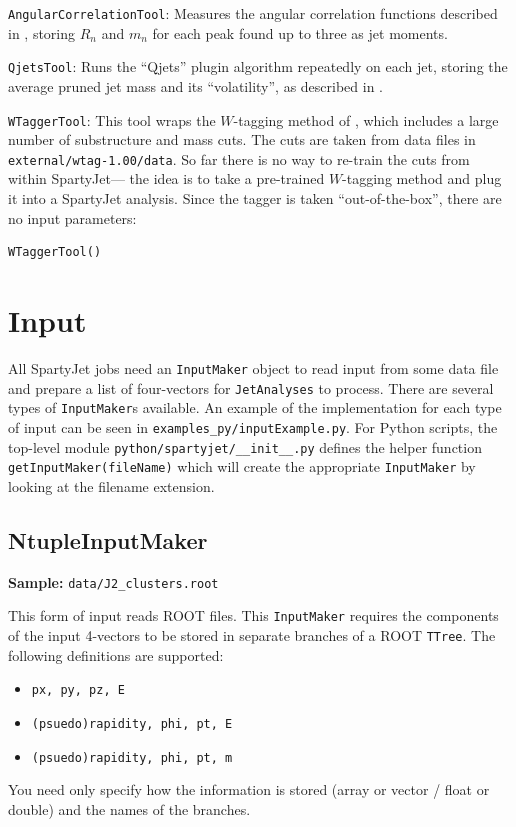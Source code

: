 \documentclass{article}
\newcommand{\prog}[1]{{\sc #1}\xspace}
\newcommand{\code}[1]{{\tt #1}\xspace}
\newcommand{\codes}[1]{{\tt #1}s\xspace}
\newcommand{\SJ}[0]{\prog{SpartyJet}}
\begin{document}
\begin{description}
\item \code{AngularCorrelationTool}:
Measures the angular correlation functions described in \cite{ACF}, storing $R_n$ and $m_n$ for each peak found up to three as jet moments.

\item \code{QjetsTool}:
Runs the ``Qjets'' plugin algorithm repeatedly on each jet, storing the average pruned jet mass and its ``volatility'', as described in \cite{Qjets}.

\item{\code{WTaggerTool}}:
This tool wraps the $W$-tagging method of \cite{Wtag}, which includes a large number of substructure and mass cuts.  The cuts are taken from data files in \verb+external/wtag-1.00/data+.  So far there is no way to re-train the cuts from within \SJ --- the idea is to take a pre-trained $W$-tagging method and plug it into a \SJ analysis.  Since the tagger is taken ``out-of-the-box'', there are no input parameters:

\begin{lstlisting}
WTaggerTool()
\end{lstlisting}

\end{description}



\section{Input}
\label{f0:Input}

All \SJ jobs need an \code{InputMaker} object to read input from some data file and prepare a list of four-vectors for \code{JetAnalyses} to process.  There are several types of \codes{InputMaker} available.  An example of the implementation for each type of input can be seen in \verb+examples_py/inputExample.py+.  For Python scripts, the top-level module \verb+python/spartyjet/__init__.py+ defines the helper function \code{getInputMaker(fileName)} which will create the appropriate \code{InputMaker} by looking at the filename extension.

\subsection{NtupleInputMaker}
{\bf Sample:} \verb+data/J2_clusters.root+

This form of input reads \prog{ROOT} files.  This \code{InputMaker} requires the components of the input 4-vectors to be stored in separate branches of a \prog{ROOT} \code{TTree}.  The following definitions are supported:
\begin{itemize}
\item \code{px, py, pz, E}
\item \code{(psuedo)rapidity, phi, pt, E}
\item \code{(psuedo)rapidity, phi, pt, m}
\end{itemize}
You need only specify how the information is stored (array or vector / float or double) and the names of the branches.
\end{document}
